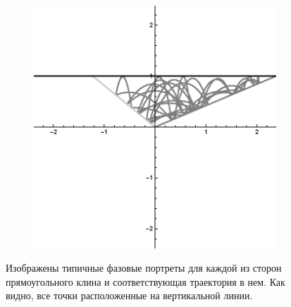 \documentclass[a4paper]{article}
\begin{document}
\begin{figure}
\begin{subfigure}[b]{0.3\textwidth}
        \label{fig:dumb_angle_b}
    \end{subfigure}
    ~ %
    \begin{subfigure}[b]{0.3\textwidth}
        \includegraphics[width=\textwidth]{dumb_angle}
        \label{fig:dumb_angle_c}
    \end{subfigure}
    \caption{Изображены типичные фазовые портреты для каждой из сторон прямоугольного клина и соответствующая траектория в нем. Как видно, все точки расположенные на вертикальной линии.}\label{obtuse}
\end{figure}

\end{document}
